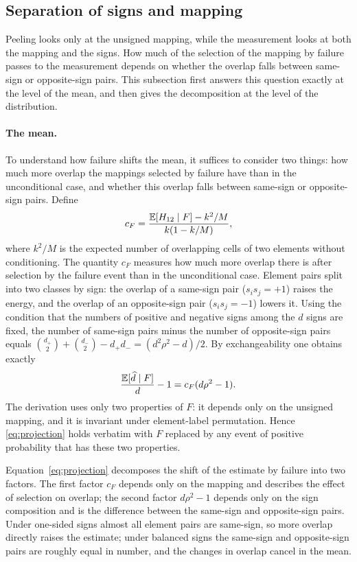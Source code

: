 \subsection{Separation of signs and mapping}\label{sec:sign}
Peeling looks only at the unsigned mapping, while the measurement looks at both the mapping and the signs. How much of the
selection of the mapping by failure passes to the measurement depends on whether the overlap falls between same-sign or
opposite-sign pairs. This subsection first answers this question exactly at the level of the mean, and then gives the
decomposition at the level of the distribution.

\paragraph{The mean.}
To understand how failure shifts the mean, it suffices to consider two things: how much more overlap the mappings selected by
failure have than in the unconditional case, and whether this overlap falls between same-sign or opposite-sign pairs. Define
\begin{equation*}
c_F=\frac{\mathbb E[H_{12}\mid F]-k^2/M}{k(1-k/M)},
\end{equation*}
where $k^2/M$ is the expected number of overlapping cells of two elements without conditioning. The quantity $c_F$ measures how much more overlap there is after selection by the failure event than in the unconditional case.
Element pairs split into two classes by sign: the overlap of a same-sign pair ($s_is_j=+1$) raises the energy, and the overlap of an opposite-sign pair ($s_is_j=-1$) lowers it. Using the condition that the numbers of positive and negative signs among the $d$
signs are fixed, the number of same-sign pairs minus the number of opposite-sign pairs equals
$\binom{d_+}2+\binom{d_-}2-d_+d_-=(d^2\rho^2-d)/2$. By exchangeability
one obtains exactly
\begin{equation}
\frac{\mathbb E[\widehat d\mid F]}d-1=c_F(d\rho^2-1).\label{eq:projection}
\end{equation}
The derivation uses only two properties of $F$: it depends only on the unsigned mapping, and it is invariant under element-label permutation. Hence \eqref{eq:projection} holds verbatim with $F$ replaced by any event of positive probability that has these two properties.

Equation~\eqref{eq:projection} decomposes the shift of the estimate by failure into two factors. The first factor $c_F$ depends only on the mapping and describes the effect of selection on overlap;
the second factor $d\rho^2-1$ depends only on the sign composition and is the difference between the same-sign and opposite-sign pairs. Under one-sided signs almost all element pairs are same-sign,
so more overlap directly raises the estimate; under balanced signs the same-sign and opposite-sign pairs are roughly equal in number, and the changes in overlap cancel in the mean.

